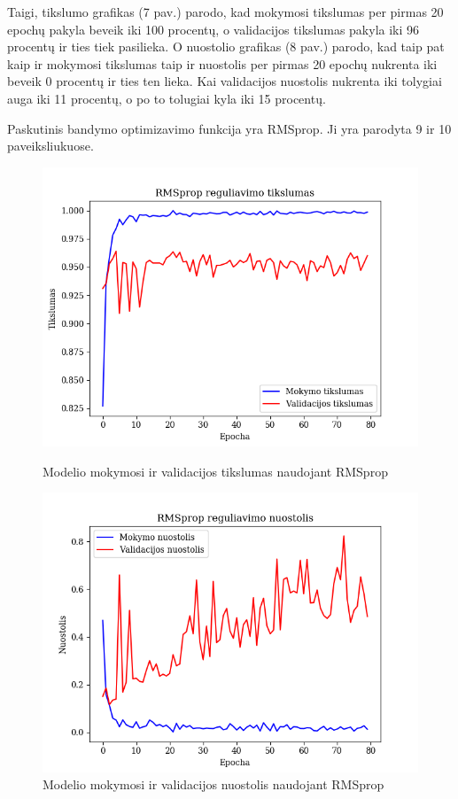 \documentclass{VUMIFPSkursinis}
\begin{document}
Taigi, tikslumo grafikas (7 pav.) parodo, kad mokymosi tikslumas per pirmas 20 epochų pakyla beveik iki 100 procentų, o validacijos tikslumas pakyla iki 96 procentų ir ties tiek pasilieka.
O nuostolio grafikas (8 pav.) parodo, kad taip pat kaip ir mokymosi tikslumas taip ir nuostolis per pirmas 20 epochų nukrenta iki beveik 0 procentų ir ties ten lieka. Kai validacijos nuostolis nukrenta iki tolygiai auga iki 11 procentų, o po to tolugiai kyla iki 15 procentų.

Paskutinis bandymo optimizavimo funkcija yra RMSprop. Ji yra parodyta 9 ir 10 paveiksliukuose.

\begin{figure}[!htbp]
  \centering
  \begin{minipage}[b]{0.49\textwidth}
    \includegraphics[width=\textwidth]{img/FT/RMSprop_acc.png}
    \caption{Modelio mokymosi ir validacijos tikslumas naudojant RMSprop}
  \end{minipage}
  \begin{minipage}[b]{0.49\textwidth}
    \includegraphics[width=\textwidth]{img/FT/RMSprop_loss.png}
    \caption{Modelio mokymosi ir validacijos nuostolis naudojant RMSprop}
  \end{minipage}
\end{figure}
\end{document}
